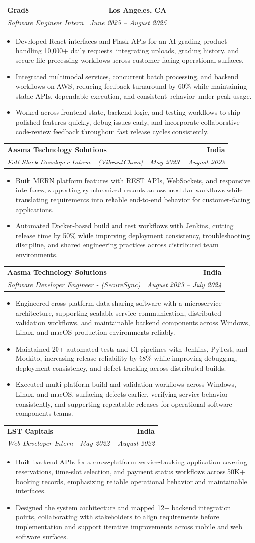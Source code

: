 \documentclass[letterpaper,10pt]{article}
\makeatletter
\newcommand{\resumeItem}[1]{\item\small{{#1 \vspace{-2pt}}}}
\newcommand{\resumeSubheading}[4]{\vspace{-1pt}\item\begin{tabular*}{1.0\textwidth}[t]{l@{\extracolsep{\fill}}r}\textbf{#1} & \textbf{\small #2} \\\textit{\small#3} & \textit{\small #4} \\\end{tabular*}\vspace{-2pt}}
\newcommand{\resumeItemListStart}{\begin{itemize}[leftmargin=0.15in,label=\textbullet,itemsep=2pt,topsep=0pt,parsep=0pt,partopsep=0pt]}
\newcommand{\resumeItemListEnd}{\end{itemize}\vspace{-4pt}}
\makeatother
\begin{document}
\resumeSubheading{Grad8}{Los Angeles, CA}{Software Engineer Intern}{June 2025 -- August 2025}
\resumeItemListStart
\resumeItem{Developed React interfaces and Flask APIs for an AI grading product handling 10,000+ daily requests, integrating uploads, grading history, and secure file-processing workflows across customer-facing operational surfaces.}
\resumeItem{Integrated multimodal services, concurrent batch processing, and backend workflows on AWS, reducing feedback turnaround by 60\% while maintaining stable APIs, dependable execution, and consistent behavior under peak usage.}
\resumeItem{Worked across frontend state, backend logic, and testing workflows to ship polished features quickly, debug issues early, and incorporate collaborative code-review feedback throughout fast release cycles consistently.}
\resumeItemListEnd

\resumeSubheading{Aasma Technology Solutions}{India}{Full Stack Developer Intern - (VibrantChem)}{May 2023 -- August 2023}
\resumeItemListStart
\resumeItem{Built MERN platform features with REST APIs, WebSockets, and responsive interfaces, supporting synchronized records across modular workflows while translating requirements into reliable end-to-end behavior for customer-facing applications.}
\resumeItem{Automated Docker-based build and test workflows with Jenkins, cutting release time by 50\% while improving deployment consistency, troubleshooting discipline, and shared engineering practices across distributed team environments.}
\resumeItemListEnd

\resumeSubheading{Aasma Technology Solutions}{India}{Software Developer Engineer - (SecureSync)}{August 2023 -- July 2024}
\resumeItemListStart
\resumeItem{Engineered cross-platform data-sharing software with a microservice architecture, supporting scalable service communication, distributed validation workflows, and maintainable backend components across Windows, Linux, and macOS production environments reliably.}
\resumeItem{Maintained 20+ automated tests and CI pipelines with Jenkins, PyTest, and Mockito, increasing release reliability by 68\% while improving debugging, deployment consistency, and defect tracking across distributed builds.}
\resumeItem{Executed multi-platform build and validation workflows across Windows, Linux, and macOS, surfacing defects earlier, verifying service behavior consistently, and supporting repeatable releases for operational software components teams.}
\resumeItemListEnd

\resumeSubheading{LST Capitals}{India}{Web Developer Intern}{May 2022 -- August 2022}
\resumeItemListStart
\resumeItem{Built backend APIs for a cross-platform service-booking application covering reservations, time-slot selection, and payment status workflows across 50K+ booking records, emphasizing reliable operational behavior and maintainable interfaces.}
\resumeItem{Designed the system architecture and mapped 12+ backend integration points, collaborating with stakeholders to align requirements before implementation and support iterative improvements across mobile and web software surfaces.}
\resumeItemListEnd
\end{document}
